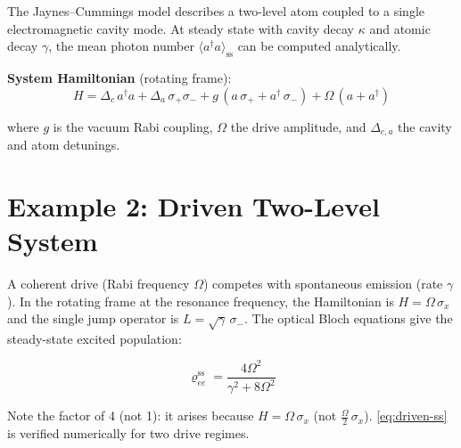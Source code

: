 \documentclass[11pt,a4paper,twoside]{book}
\theoremstyle{definition}
\theoremstyle{remark}
\begin{document}
The Jaynes--Cummings model describes a two-level atom coupled to a
single electromagnetic cavity mode. At steady state with cavity decay
$\kappa$ and atomic decay $\gamma$, the mean photon number
$\langle a^\dagger a \rangle_{\mathrm{ss}}$ can be computed analytically.

\textbf{System Hamiltonian} (rotating frame):
\begin{equation}
  H = \Delta_c\,a^\dagger a + \Delta_a\,\sigma_+\sigma_-
    + g\,(a\,\sigma_+ + a^\dagger\,\sigma_-)
    + \Omega\,(a + a^\dagger)
  \label{eq:jc-hamiltonian}
\end{equation}

where $g$ is the vacuum Rabi coupling, $\Omega$ the drive amplitude,
and $\Delta_{c,a}$ the cavity and atom detunings.


\section{Example 2: Driven Two-Level System}
\label{sec:ex-driven}

A coherent drive (Rabi frequency $\Omega$) competes with spontaneous emission
(rate $\gamma$). In the rotating frame at the resonance frequency, the
Hamiltonian is $H = \Omega\,\sigma_x$ and the single jump operator is
$L = \sqrt{\gamma}\,\sigma_-$. The optical Bloch equations give the
steady-state excited population:

\begin{equation}
  \varrho_{ee}^{\mathrm{ss}}
    = \frac{4\Omega^2}{\gamma^2 + 8\Omega^2}
  \label{eq:driven-ss}
\end{equation}

Note the factor of 4 (not 1): it arises because
$H = \Omega\,\sigma_x$ (not $\tfrac{\Omega}{2}\,\sigma_x$).
\cref{eq:driven-ss} is verified numerically for two drive regimes.
\end{document}
